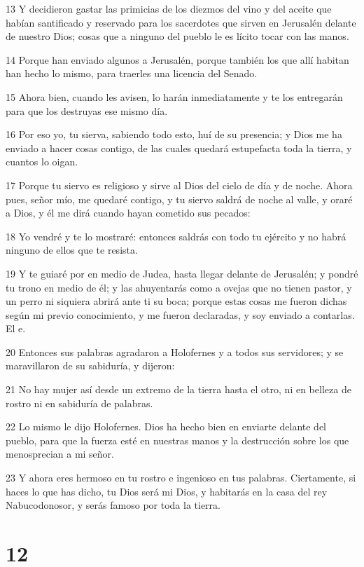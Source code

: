 \par 13 Y decidieron gastar las primicias de los diezmos del vino y del aceite que habían santificado y reservado para los sacerdotes que sirven en Jerusalén delante de nuestro Dios; cosas que a ninguno del pueblo le es lícito tocar con las manos.
\par 14 Porque han enviado algunos a Jerusalén, porque también los que allí habitan han hecho lo mismo, para traerles una licencia del Senado.
\par 15 Ahora bien, cuando les avisen, lo harán inmediatamente y te los entregarán para que los destruyas ese mismo día.
\par 16 Por eso yo, tu sierva, sabiendo todo esto, huí de su presencia; y Dios me ha enviado a hacer cosas contigo, de las cuales quedará estupefacta toda la tierra, y cuantos lo oigan.
\par 17 Porque tu siervo es religioso y sirve al Dios del cielo de día y de noche. Ahora pues, señor mío, me quedaré contigo, y tu siervo saldrá de noche al valle, y oraré a Dios, y él me dirá cuando hayan cometido sus pecados:
\par 18 Yo vendré y te lo mostraré: entonces saldrás con todo tu ejército y no habrá ninguno de ellos que te resista.
\par 19 Y te guiaré por en medio de Judea, hasta llegar delante de Jerusalén; y pondré tu trono en medio de él; y las ahuyentarás como a ovejas que no tienen pastor, y un perro ni siquiera abrirá ante ti su boca; porque estas cosas me fueron dichas según mi previo conocimiento, y me fueron declaradas, y soy enviado a contarlas. El e.
\par 20 Entonces sus palabras agradaron a Holofernes y a todos sus servidores; y se maravillaron de su sabiduría, y dijeron:
\par 21 No hay mujer así desde un extremo de la tierra hasta el otro, ni en belleza de rostro ni en sabiduría de palabras.
\par 22 Lo mismo le dijo Holofernes. Dios ha hecho bien en enviarte delante del pueblo, para que la fuerza esté en nuestras manos y la destrucción sobre los que menosprecian a mi señor.
\par 23 Y ahora eres hermoso en tu rostro e ingenioso en tus palabras. Ciertamente, si haces lo que has dicho, tu Dios será mi Dios, y habitarás en la casa del rey Nabucodonosor, y serás famoso por toda la tierra.

\chapter{12}

